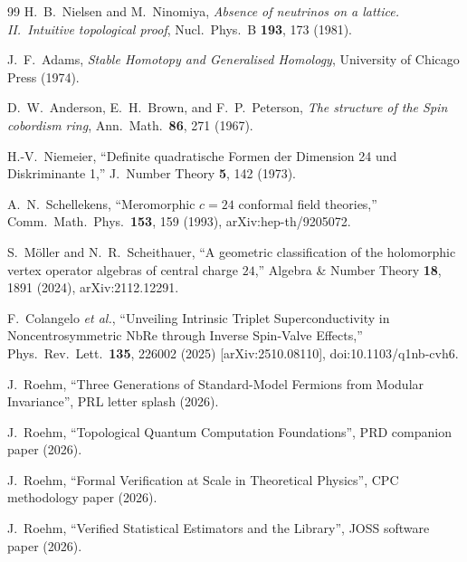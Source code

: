 \documentclass[aps,prd,reprint,nofootinbib,superscriptaddress]{revtex4-2}
\makeatletter
\DeclareRobustCommand{\texttt}[1]{%
  \skeft@origtexttt{\let\skeftunder\_\def\_{\skeftunder\allowbreak}#1}}
\makeatother
\begin{document}
\begin{thebibliography}{99}
H.~B.~Nielsen and M.~Ninomiya,
\emph{Absence of neutrinos on a lattice. II.~Intuitive topological proof},
Nucl.~Phys.~B \textbf{193}, 173 (1981).

J.~F.~Adams,
\emph{Stable Homotopy and Generalised Homology},
University of Chicago Press (1974).

D.~W.~Anderson, E.~H.~Brown, and F.~P.~Peterson,
\emph{The structure of the Spin cobordism ring},
Ann.~Math.~\textbf{86}, 271 (1967).

H.-V.~Niemeier,
``Definite quadratische Formen der Dimension 24 und Diskriminante 1,''
J.\ Number Theory \textbf{5}, 142 (1973).

A.~N.~Schellekens,
``Meromorphic $c=24$ conformal field theories,''
Comm.\ Math.\ Phys.\ \textbf{153}, 159 (1993),
arXiv:hep-th/9205072.

S.~M\"oller and N.~R.~Scheithauer,
``A geometric classification of the holomorphic vertex operator
algebras of central charge $24$,''
Algebra \& Number Theory \textbf{18}, 1891 (2024),
arXiv:2112.12291.

F.~Colangelo \emph{et al.},
``Unveiling Intrinsic Triplet Superconductivity in
Noncentrosymmetric NbRe through Inverse Spin-Valve Effects,''
Phys.\ Rev.\ Lett.\ \textbf{135}, 226002 (2025)
[arXiv:2510.08110], doi:10.1103/q1nb-cvh6.

J.~Roehm, ``Three Generations of Standard-Model Fermions from
Modular Invariance'', PRL letter splash (2026).

J.~Roehm, ``Topological Quantum Computation Foundations'', PRD
companion paper (2026).

J.~Roehm, ``Formal Verification at Scale in Theoretical Physics'',
CPC methodology paper (2026).

J.~Roehm, ``Verified Statistical Estimators and the
\texttt{lean-tensor-categories} Library'', JOSS software paper (2026).

\end{thebibliography}
\end{document}
